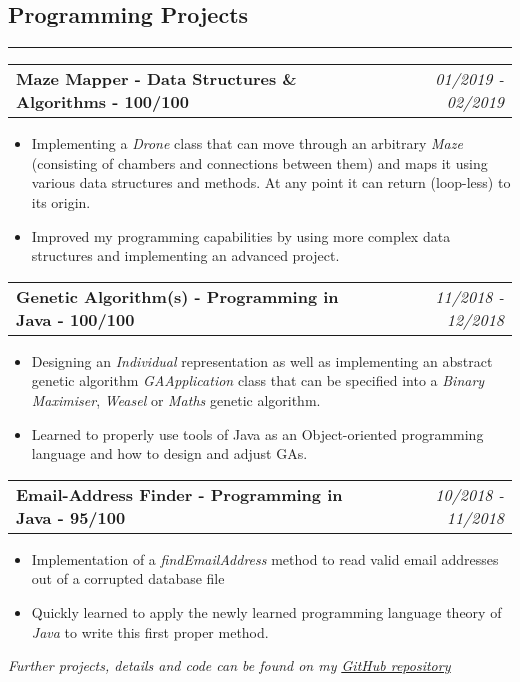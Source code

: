 \documentclass[10pt,letterpaper]{article}
\makeatletter
\newcommand{\headerrow}[2]
{\begin{tabular*}{\linewidth}{l@{\extracolsep{\fill}}r}
	#1 &
	#2 \\
\end{tabular*}}
\makeatother
\begin{document}
\subsection*{Programming Projects}
\hrule
\vspace{0.4em}
\noindent
\headerrow{\textbf{Maze Mapper - Data Structures \& Algorithms - 100/100}}{\emph{01/2019 - 02/2019}}
\vspace{-1.6em}
\begin{itemize}
    \setlength\itemsep{0em}
    \item Implementing a \emph{Drone} class that can move through an arbitrary \emph{Maze} (consisting of chambers and connections between them) and maps it using various data structures and methods. At any point it can return (loop-less) to its origin.
    \item Improved my programming capabilities by using more complex data structures and implementing an advanced project.
\end{itemize}
\vspace{0.4em}

\noindent
\headerrow{\textbf{Genetic Algorithm(s) - Programming in Java - 100/100}}{\emph{11/2018 - 12/2018}}
\vspace{-1.6em}
\begin{itemize}
    \setlength\itemsep{0em}
    \item Designing an \emph{Individual} representation as well as implementing an abstract genetic algorithm \emph{GAApplication} class that can be specified into a \emph{Binary Maximiser}, \emph{Weasel} or \emph{Maths} genetic algorithm.
    \item Learned to properly use tools of Java as an Object-oriented programming language and how to design and adjust GAs.
\end{itemize}
\vspace{0.4em}

\noindent
\headerrow{\textbf{Email-Address Finder - Programming in Java - 95/100}}{\emph{10/2018 - 11/2018}}
\vspace{-1.6em}
\begin{itemize}
    \setlength\itemsep{0em}
    \item Implementation of a \emph{findEmailAddress} method to read valid email addresses out of a corrupted database file
    \item Quickly learned to apply the newly learned programming language theory of \emph{Java} to write this first proper method.
\end{itemize}
\emph{Further projects, details and code can be found on my \href{https://github.com/j0ner0n}{\underline{GitHub repository}}}
\end{document}
